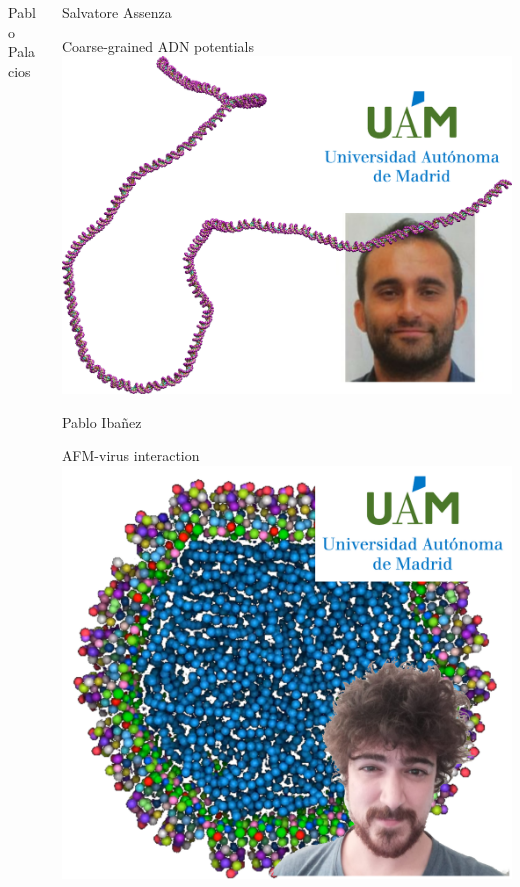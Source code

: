 \documentclass[xcolor=dvipsnames, compress]{beamer}
\begin{document}
\begin{frame}
\begin{columns}[T]
\begin{column}{0.32\linewidth}
\begin{block}{Pablo Palacios}
\begin{center}
        \end{center}
      \end{block}
    \end{column}
    \begin{column}{0.32\linewidth}
      \begin{block}{Salvatore Assenza}
        \begin{center}
          \scriptsize Coarse-grained ADN potentials\newline
          \includegraphics[height=0.3\paperheight]{salvatore}
        \end{center}
      \end{block}
      \vspace*{-7pt}
      \begin{block}{Pablo Ibañez}
        \begin{center}
          \scriptsize AFM-virus interaction\newline
          \includegraphics[height=0.3\paperheight]{pabloibanez}

\end{center}
\end{block}
\end{column}
\end{columns}
\end{frame}
\end{document}
